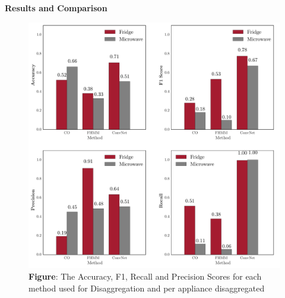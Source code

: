 \documentclass[landscape,fontscale=0.48,margin=2cm,paperwidth=135truecm,paperheight=89truecm]{baposter}
\begin{document}
\begin{poster}
%
\begin{posterbox}[column=3]{\LARGE \bfseries Results and Comparison}
\begin{figure}
\begin{center}
\includegraphics[width=\textwidth]{Scores}
\caption*{\footnotesize  \textbf{Figure}: The Accuracy, F1, Recall and Precision Scores for each method used for Disaggregation and per appliance disaggregated} \vspace*{-1 cm}
\end{center}
\end{figure}



\vspace{8em}
\end{posterbox}




\end{poster}
\end{document}
